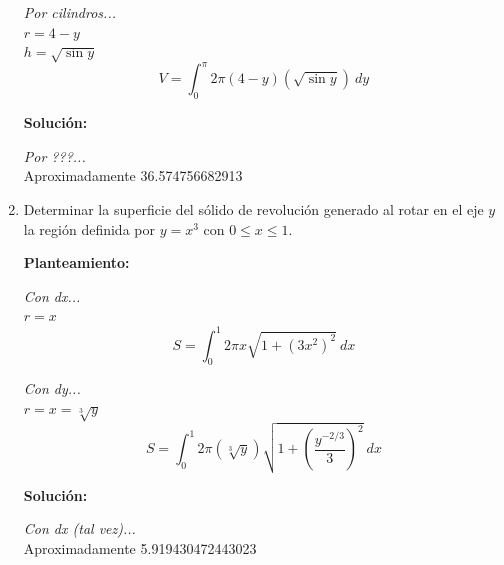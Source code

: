 \documentclass[10pt,letterpaper]{article}
\begin{document}
\begin{enumerate}
\begin{multicols}{2}
\textit{Por cilindros...} \\
$r = 4-y$ \\
$h = \sqrt{\sin y}$
$$V = \int_{0}^{\pi} 2\pi (4-y) (\sqrt{\sin y})\ dy$$

\textbf{Solución:}

\textit{Por ???...} \\
Aproximadamente 36.574756682913

\end{multicols}

\item Determinar la superficie del sólido de revolución generado al rotar en el eje $y$ la región
      definida por $y = x^3$ con $0 \leq x \leq 1$.

\begin{multicols}{2}


\textbf{Planteamiento:}

\textit{Con dx...} \\
$r = x$
$$S = \int_{0}^{1} 2\pi x \sqrt{1+ (3x^2)^2 }\ dx$$

\textit{Con dy...} \\
$r = x = \sqrt[3]{y}$
$$S = \int_{0}^{1} 2\pi (\sqrt[3]{y}) \sqrt{1+ (\frac{y^{-2/3}}{3})^2 }\ dx$$

\textbf{Solución:}

\textit{Con dx (tal vez)...} \\
Aproximadamente 5.919430472443023

\end{multicols}

\end{enumerate}
\end{document}
